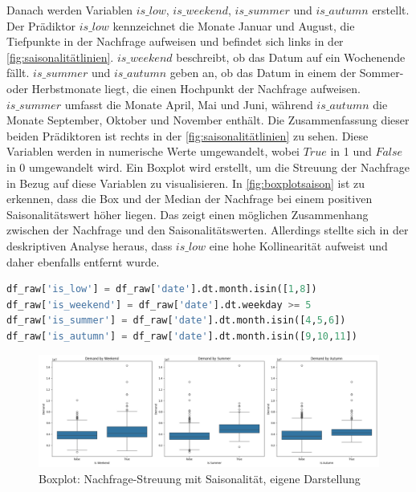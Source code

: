 \noindent
Danach werden Variablen \(is\_low\), \(is\_weekend\), \(is\_summer\) und \(is\_autumn\) erstellt. Der Prädiktor \(is\_low\) kennzeichnet die Monate Januar und August, die Tiefpunkte in der Nachfrage aufweisen und befindet sich links in der \autoref{fig:saisonalitätlinien}. \(is\_weekend\) beschreibt, ob das Datum auf ein Wochenende fällt. \(is\_summer\) und \(is\_autumn\) geben an, ob das Datum in einem der Sommer- oder Herbstmonate liegt, die einen Hochpunkt der Nachfrage aufweisen. \(is\_summer\) umfasst die Monate April, Mai und Juni, während \(is\_autumn\) die Monate September, Oktober und November enthält. Die Zusammenfassung dieser beiden Prädiktoren ist rechts in der \autoref{fig:saisonalitätlinien} zu sehen. Diese Variablen werden in numerische Werte umgewandelt, wobei \(True\) in 1 und \(False\) in 0 umgewandelt wird. Ein Boxplot wird erstellt, um die Streuung der Nachfrage in Bezug auf diese Variablen zu visualisieren. In \autoref{fig:boxplotsaison} ist zu erkennen, dass die Box und der Median der Nachfrage bei einem positiven Saisonalitätswert höher liegen. Das zeigt einen möglichen Zusammenhang zwischen der Nachfrage und den Saisonalitätswerten. Allerdings stellte sich in der deskriptiven Analyse heraus, dass \(is\_low\) eine hohe Kollinearität aufweist und daher ebenfalls entfernt wurde.
\begin{lstlisting}[language=Python, linewidth=\textwidth]
df_raw['is_low'] = df_raw['date'].dt.month.isin([1,8])
df_raw['is_weekend'] = df_raw['date'].dt.weekday >= 5  
df_raw['is_summer'] = df_raw['date'].dt.month.isin([4,5,6])  
df_raw['is_autumn'] = df_raw['date'].dt.month.isin([9,10,11]) 
\end{lstlisting}
\begin{figure}[H]
    \centering
    \includegraphics[width=1\linewidth]{images/boxplot.png}
    \caption{Boxplot: Nachfrage-Streuung mit Saisonalität, eigene Darstellung}
    \label{fig:boxplotsaison}
\end{figure}
